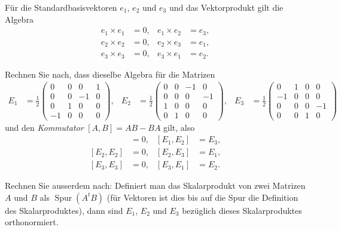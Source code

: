 Für die Standardbasisvektoren $e_1$, $e_2$ und $e_3$ und das Vektorprodukt
gilt die Algebra
\begin{align*}
e_1\times e_1&=0,&
e_1\times e_2&=e_3,\\
e_2\times e_2&=0,&
e_2\times e_3&=e_1,\\
e_3\times e_3&=0,&
e_3\times e_1&=e_2.
\end{align*}
\begin{teilaufgaben}
\item
Rechnen Sie nach, dass dieselbe Algebra für die Matrizen
\begin{align*}
E_1&=\frac12\begin{pmatrix}
 0& 0& 0& 1\\
 0& 0&-1& 0\\
 0& 1& 0& 0\\
-1& 0& 0& 0
\end{pmatrix},
&
E_2&=\frac12\begin{pmatrix}
 0& 0&-1& 0\\
 0& 0& 0&-1\\
 1& 0& 0& 0\\
 0& 1& 0& 0
\end{pmatrix},
&
E_3&=\frac12\begin{pmatrix}
 0& 1& 0& 0\\
-1& 0& 0& 0\\
 0& 0& 0&-1\\
 0& 0& 1& 0
\end{pmatrix}
&
\end{align*}
und den {\em Kommutator} $[A,B]=AB-BA$ gilt, also
\begin{align*}
[E_1, E_1]&=0,&
[E_1, E_2]&=E_3,\\
[E_2, E_2]&=0,&
[E_2, E_3]&=E_1,\\
[E_3, E_3]&=0,&
[E_3, E_1]&=E_2.
\end{align*}
\item
Rechnen Sie ausserdem nach:
Definiert man das Skalarprodukt von zwei Matrizen $A$ und $B$ als
$\operatorname{Spur}(A^tB)$
(für Vektoren ist dies bis auf die Spur die Definition des Skalarproduktes),
dann sind $E_1$, $E_2$
und $E_3$ bezüglich dieses Skalarproduktes orthonormiert.
\end{teilaufgaben}

